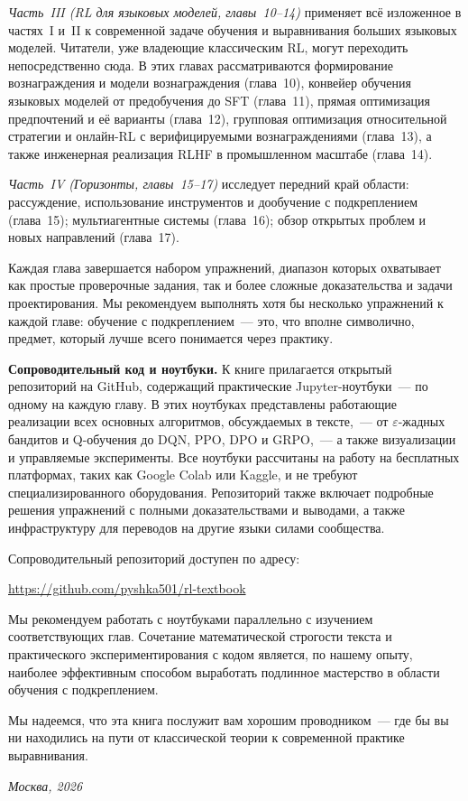 \emph{Часть~III (RL для языковых моделей, главы~10--14)} применяет всё изложенное в частях~I и~II к современной задаче обучения и выравнивания больших языковых моделей. Читатели, уже владеющие классическим RL, могут переходить непосредственно сюда. В этих главах рассматриваются формирование вознаграждения и модели вознаграждения (глава~10), конвейер обучения языковых моделей от предобучения до SFT (глава~11), прямая оптимизация предпочтений и её варианты (глава~12), групповая оптимизация относительной стратегии и онлайн-RL с верифицируемыми вознаграждениями (глава~13), а также инженерная реализация RLHF в промышленном масштабе (глава~14).

\emph{Часть~IV (Горизонты, главы~15--17)} исследует передний край области: рассуждение, использование инструментов и дообучение с подкреплением (глава~15); мультиагентные системы (глава~16); обзор открытых проблем и новых направлений (глава~17).

Каждая глава завершается набором упражнений, диапазон которых охватывает как простые проверочные задания, так и более сложные доказательства и задачи проектирования. Мы рекомендуем выполнять хотя бы несколько упражнений к каждой главе: обучение с подкреплением~--- это, что вполне символично, предмет, который лучше всего понимается через практику.

\medskip

\textbf{Сопроводительный код и ноутбуки.}\quad
К книге прилагается открытый репозиторий на GitHub, содержащий практические Jupyter-ноутбуки~--- по одному на каждую главу. В этих ноутбуках представлены работающие реализации всех основных алгоритмов, обсуждаемых в тексте,~--- от $\varepsilon$-жадных бандитов и Q-обучения до DQN, PPO, DPO и GRPO,~--- а также визуализации и управляемые эксперименты. Все ноутбуки рассчитаны на работу на бесплатных платформах, таких как Google Colab или Kaggle, и не требуют специализированного оборудования. Репозиторий также включает подробные решения упражнений с полными доказательствами и выводами, а также инфраструктуру для переводов на другие языки силами сообщества.

Сопроводительный репозиторий доступен по адресу:

\medskip
\centerline{\url{https://github.com/pyshka501/rl-textbook}}
\medskip

\noindent
Мы рекомендуем работать с ноутбуками параллельно с изучением соответствующих глав. Сочетание математической строгости текста и практического экспериментирования с кодом является, по нашему опыту, наиболее эффективным способом выработать подлинное мастерство в области обучения с подкреплением.

\medskip

Мы надеемся, что эта книга послужит вам хорошим проводником~--- где бы вы ни находились на пути от классической теории к современной практике выравнивания.

\bigskip

\hfill\textit{Москва, 2026}

